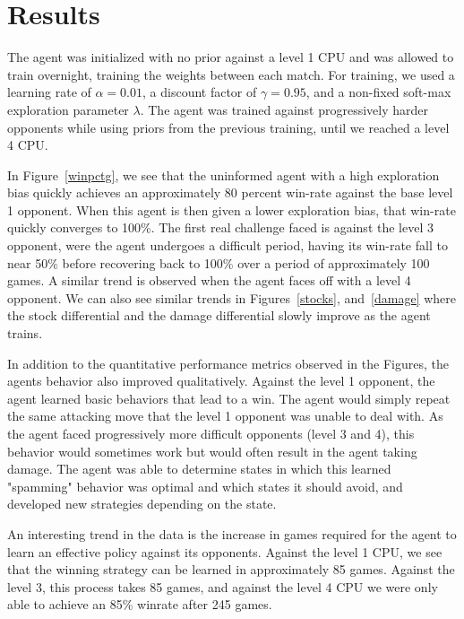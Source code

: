 \section{Results}
The agent was initialized with no prior against a level 1 CPU and was allowed to train overnight, training the weights between each match. For training, we used a learning rate of $\alpha = 0.01$, a discount factor of $\gamma = 0.95$, and a non-fixed soft-max exploration parameter $\lambda$. The agent was trained against progressively harder opponents while using priors from the previous training, until we reached a level 4 CPU.

In Figure~\ref{winpctg}, we see that the uninformed agent with a high exploration bias quickly achieves an approximately 80 percent win-rate against the base level 1 opponent. When this agent is then given a lower exploration bias, that win-rate quickly converges to 100\%. The first real challenge faced is against the level 3 opponent, were the agent undergoes a difficult period, having its win-rate fall to near 50\% before recovering back to 100\% over a period of approximately 100 games. A similar trend is observed when the agent faces off with a level 4 opponent. We can also see similar trends in Figures~\ref{stocks}, and~\ref{damage} where the stock differential and the damage differential slowly improve as the agent trains. 

In addition to the quantitative performance metrics observed in the Figures, the agents behavior also improved qualitatively. Against the level 1 opponent, the agent learned basic behaviors that lead to a win. The agent would simply repeat the same attacking move that the level 1 opponent was unable to deal with. As the agent faced progressively more difficult opponents (level 3 and 4), this behavior would sometimes work but would often result in the agent taking damage. The agent was able to determine states in which this learned "spamming" behavior was optimal and which states it should avoid, and developed new strategies depending on the state.

An interesting trend in the data is the increase in games required for the agent to learn an effective policy against its opponents. Against the level 1 CPU, we see that the winning strategy can be learned in approximately 85 games. Against the level 3, this process takes 85 games, and against the level 4 CPU we were only able to achieve an 85\% winrate after 245 games. 




